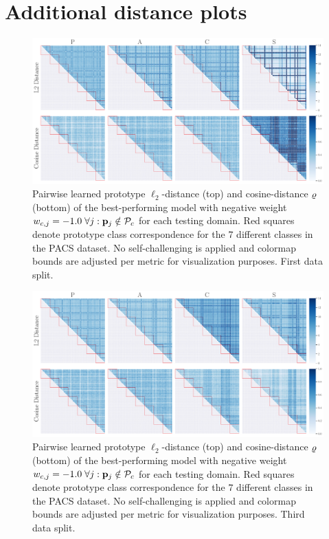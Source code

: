 \chapter{Additional distance plots}
\label{sec:additional_distances}

\begin{figure}[ht]
    \centering
    \includegraphics[width=\textwidth]{Figures/Chapter4/2021-01-21-ProDropIncorrectWeight-1.0SAVEResNet18oracle_validation_trial0.pdf}
    \caption[First data split pairwise prototype distances with $w_{c,j} = -1.0$] {Pairwise learned prototype $\ell_2$-distance (top) and cosine-distance $\varrho$ (bottom) of the best-performing model with negative weight $w_{c,j} = -1.0\; \forall j: \mathbf{p}_{j} \notin \mathcal{P}_c$ for each testing domain. Red squares denote prototype class correspondence for the $7$ different classes in the PACS dataset. No self-challenging is applied and colormap bounds are adjusted per metric for visualization purposes. First data split.}
    \label{fig:pairwise_distance}
\end{figure}

\begin{figure}[ht]
    \centering
    \includegraphics[width=\textwidth]{Figures/Chapter4/2021-01-21-ProDropIncorrectWeight-1.0SAVEResNet18oracle_validation_trial2.pdf}
    \caption[Third data split pairwise prototype distances with $w_{c,j} = -1.0$] {Pairwise learned prototype $\ell_2$-distance (top) and cosine-distance $\varrho$ (bottom) of the best-performing model with negative weight $w_{c,j} = -1.0\; \forall j: \mathbf{p}_{j} \notin \mathcal{P}_c$ for each testing domain. Red squares denote prototype class correspondence for the $7$ different classes in the PACS dataset. No self-challenging is applied and colormap bounds are adjusted per metric for visualization purposes. Third data split.}
    \label{fig:pw_distance_trial2}
\end{figure}

